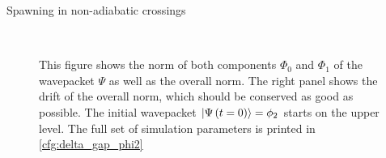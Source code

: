 \begin{chapter}{Spawning in non-adiabatic crossings}
\begin{figure}[h!]
  \centering
   \\
  \caption[Norms and norm drift for a $\phi_2$ in an avoided crossing]{
  This figure shows the norm of both components $\Phi_0$ and $\Phi_1$ of the
  wavepacket $\Psi$ as well as the overall norm. The right panel shows the drift
  of the overall norm, which should be conserved as good as possible.
  The initial wavepacket $\Ket{\Psi\left( t=0 \right)} = \phi_2$ starts on the upper level.
  The full set of simulation parameters is printed in \ref{cfg:delta_gap_phi2}
  \label{fig:basic_delta_gap_phi2_norms}
  }
\end{figure}



\end{chapter}
